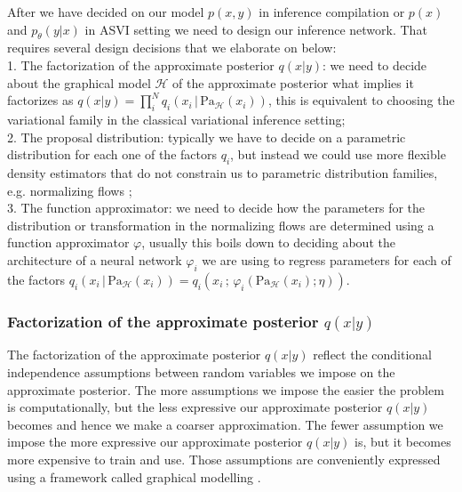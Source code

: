 \documentclass[12pt]{article}
\begin{document}
After we have decided on our model $p(x,y)$ in inference compilation or $p(x)$ and $p_\theta(y|x)$ in ASVI setting we need to design our inference network. 
That requires several design decisions that we elaborate on below:\\
1. The factorization of the approximate posterior $q(x|y)$: we need to decide about the graphical model $\mathcal{H}$ of the approximate posterior what implies it factorizes as $q(x|y)=\prod^N_i q_i(x_i\,|\,\text{Pa}_\mathcal{H}(x_i))$, this is equivalent to choosing the variational family in the classical variational inference setting;\\
2. The proposal distribution: typically we have to decide on a parametric distribution for each one of the factors $q_i$, but instead we could use more flexible density estimators that do not constrain us to parametric distribution families, e.g. normalizing flows \citep{RezendeMohamed2015}; \\
3. The function approximator: we need to decide how the parameters for the distribution or transformation in the normalizing flows are determined using a function approximator $\varphi$, usually this boils down to deciding about the architecture of a neural network $\varphi_i$ we are using to regress parameters for each of the factors 
$q_i(x_i\,|\,\text{Pa}_\mathcal{H}(x_i)) = q_i(x_i\,;\,\varphi_i(\text{Pa}_\mathcal{H}(x_i); \eta))$.\\


\subsubsection*{Factorization of the approximate posterior $q(x|y)$}


The factorization of the approximate posterior $q(x|y)$ reflect the conditional independence assumptions between random variables we impose on the approximate posterior.
The more assumptions we impose the easier the problem is computationally, but the less expressive our approximate posterior $q(x|y)$ becomes and hence we make a coarser approximation.
The fewer assumption we impose the more expressive our approximate posterior $q(x|y)$ is, but it becomes more expensive to train and use.
Those assumptions are conveniently expressed using a framework called graphical modelling \citep{KollerFriedman2009}.
\end{document}
